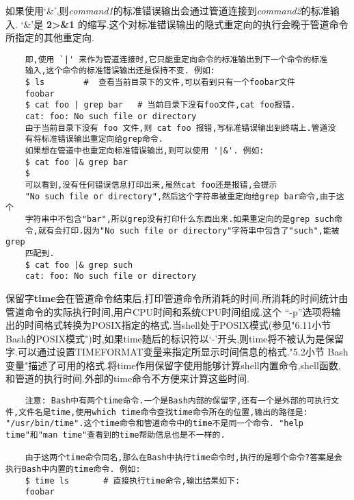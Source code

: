 \documentclass[draft,openany]{book}
\begin{document}
\begin{CJK}{UTF8}{gbsn}
    如果使用`\textbar \&',则\emph{command1}的标准错误输出会通过管道连接到\emph{command2}的标准输入. `\textbar \&'是 \textbf{2\textgreater\&1 \textbar} 的缩写.这个对标准错误输出的隐式重定向的执行会晚于管道命令所指定的其他重定向.

    \begin{verbatim}
    即,使用 `|' 来作为管道连接时,它只能重定向命令的标准输出到下一个命令的标准
    输入,这个命令的标准错误输出还是保持不变. 例如:
    $ ls        #  查看当前目录下的文件,可以看到只有一个foobar文件
    foobar
    $ cat foo | grep bar   # 当前目录下没有foo文件,cat foo报错.
    cat: foo: No such file or directory
    由于当前目录下没有 foo 文件,则 cat foo 报错,写标准错误输出到终端上.管道没
    有将标准错误输出重定向给grep命令.
    如果想在管道中也重定向标准错误输出,则可以使用 '|&'. 例如:
    $ cat foo |& grep bar
    $ 
    可以看到,没有任何错误信息打印出来,虽然cat foo还是报错,会提示
    "No such file or directory",然后这个字符串被重定向给grep bar命令,由于这个
    字符串中不包含"bar",所以grep没有打印什么东西出来.如果重定向的是grep such命
    令,就有会打印.因为"No such file or directory"字符串中包含了"such",能被grep
    匹配到.
    $ cat foo |& grep such
    cat: foo: No such file or directory
    \end{verbatim}

    保留字\textbf{time}会在管道命令结束后,打印管道命令所消耗的时间.所消耗的时间统计由管道命令的实际执行时间,用户CPU时间和系统CPU时间组成.这个 ``-p''选项将输出的时间格式转换为POSIX指定的格式.当shell处于POSIX模式(参见"6.11小节 Bash的POSIX模式")时,如果time随后的标识符以`-'开头,则time将不被认为是保留字.可以通过设置TIMEFORMAT变量来指定所显示时间信息的格式."5.2小节 Bash变量"描述了可用的格式.将time作用保留字使用能够计算shell内置命令,shell函数,和管道的执行时间.外部的time命令不方便来计算这些时间.

    \begin{verbatim}
    注意: Bash中有两个time命令.一个是Bash内部的保留字,还有一个是外部的可执行文件,文件名是time,使用which time命令查找time命令所在的位置,输出的路径是: "/usr/bin/time".这个time命令和管道命令中的time不是同一个命令. "help time"和"man time"查看到的time帮助信息也是不一样的.

    由于这两个time命令同名,那么在Bash中执行time命令时,执行的是哪个命令?答案是会执行Bash中内置的time命令. 例如:
    $ time ls       # 直接执行time命令,输出结果如下:
    foobar


\end{verbatim}
\end{CJK}
\end{document}
